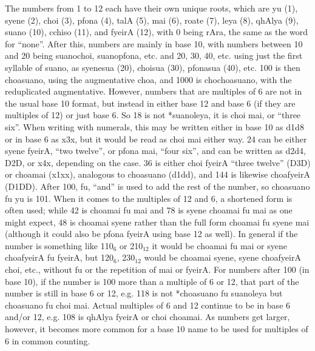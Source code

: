 \documentclass{article}
\begin{document}
The numbers from 1 to 12 each have their own unique roots, which are {\quch yu} (1), {\quch syene} (2), {\quch choi} (3), {\quch pfona} (4), {\quch talA} (5), {\quch mai} (6), {\quch roate} (7), {\quch leya} (8), {\quch qhAlya} (9), {\quch suano} (10), {\quch cchiso} (11), and {\quch fyeirA} (12), with 0 being {\quch rAra}, the same as the word for ``none''.  After this, numbers are mainly in base 10, with numbers between 10 and 20 being {\quch suanochoi}, {\quch suanopfona}, etc. and 20, 30, 40, etc. using just the first syllable of {\quch suano}, as {\quch syenesua} (20), {\quch choisua} (30), {\quch pfonasua} (40), etc.  100 is then {\quch choasuano}, using the augmentative {\quch choa}, and 1000 is {\quch chochoasuano}, with the reduplicated augmentative.  However, numbers that are multiples of 6 are not in the usual base 10 format, but instead in either base 12 and base 6 (if they are multiples of 12) or just base 6.  So 18 is not *{\quch suanoleya}, it is {\quch choi mai}, or ``three six''.  When writing with numerals, this may be written either in base 10 as {\quch d1d8} or in base 6 as {\quch x3x}, but it would be read as {\quch choi mai} either way.  24 can be either {\quch syene fyeirA}, ``two twelve'', or {\quch pfona mai}, ``four six'', and can be written as {\quch d2d4}, {\quch D2D}, or {\quch x4x}, depending on the case.  36 is either {\quch choi fyeirA} ``three twelve'' ({\quch D3D}) or {\quch choamai} ({\quch x1xx}), analogous to {\quch choasuano} ({\quch d1dd}), and 144 is likewise {\quch choafyeirA} ({\quch D1DD}).  After 100, {\quch fu}, ``and'' is used to add the rest of the number, so {\quch choasuano fu yu} is 101.  When it comes to the multiples of 12 and 6, a shortened form is often used; while 42 is {\quch choamai fu mai} and 78 is {\quch syene choamai fu mai} as one might expect, 48 is {\quch choamai syene} rather than the full form {\quch choamai fu syene mai} (although it could also be {\quch pfona fyeirA} using base 12 as well).  In general if the number is something like 110$_6$ or 210$_{12}$ it would be {\quch choamai fu mai} or {\quch syene choafyeirA fu fyeirA}, but 120$_6$, 230$_{12}$ would be {\quch choamai syene}, {\quch syene choafyeirA choi}, etc., without {\quch fu} or the repetition of {\quch mai} or {\quch fyeirA}.  For numbers after 100 (in base 10), if the number is 100 more than a multiple of 6 or 12, that part of the number is still in base 6 or 12, e.g. 118 is not *{\quch choasuano fu suanoleya} but {\quch choasuano fu choi mai}.  Actual multiples of 6 and 12 continue to be in base 6 and/or 12, e.g. 108 is {\quch qhAlya fyeirA} or {\quch choi choamai}.  As numbers get larger, however, it becomes more common for a base 10 name to be used for multiples of 6 in common counting.
\end{document}
